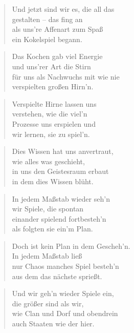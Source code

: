 \documentclass[10pt,a4paper]{article}
\begin{document}
\begin{paracol}{2}
\begin{verse}
Und jetzt sind wir es, die all das \\
gestalten – das fing an \\
als uns’re Affenart zum Spaß \\
ein Kokelspiel begann. \\
\end{verse}

\begin{verse}
Das Kochen gab viel Energie \\
und uns’rer Art die Stirn \\
für uns als Nachwuchs mit wie nie \\
verspielten großen Hirn’n. \\
\end{verse}

\begin{verse}
Verspielte Hirne lassen uns \\
verstehen, wie die viel’n \\
Prozesse uns erspielen und \\
wir lernen, sie zu spiel’n. \\
\end{verse}

\begin{verse}
Dies Wissen hat uns anvertraut, \\
wie alles was geschieht, \\
in uns den Geistesraum erbaut \\
in dem dies Wissen blüht. \\
\end{verse}

\begin{verse}
In jedem Maßstab wieder seh’n \\
wir Spiele, die spontan \\
einander spielend fortbesteh’n \\
als folgten sie ein’m Plan. \\
\end{verse}

\begin{verse}
Doch ist kein Plan in dem Gescheh’n. \\
In jedem Maßstab ließ \\
nur Chaos manches Spiel besteh’n \\
aus dem das nächste sprießt. \\
\end{verse}

\begin{verse}
Und wir geh’n wieder Spiele ein, \\
die größer sind als wir, \\
wie Clan und Dorf und obendrein \\
auch Staaten wie der hier. \\
\end{verse}


\end{paracol}
\end{document}
